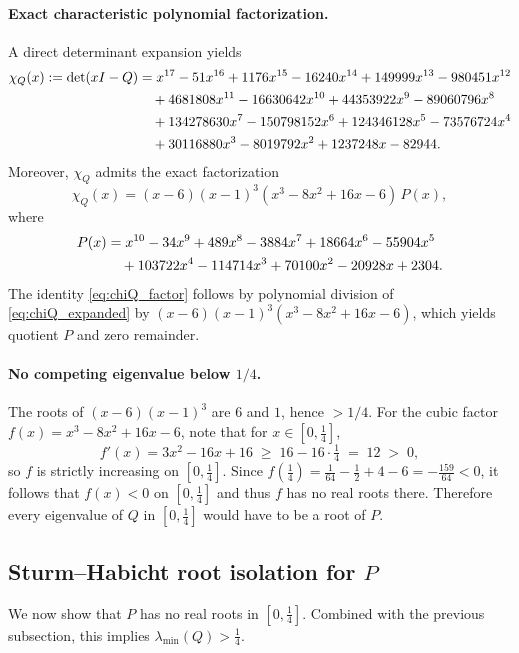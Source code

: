 \paragraph{Exact characteristic polynomial factorization.}
A direct determinant expansion yields
\begin{align}
\chi_Q(x):=\det(xI-Q)
&=x^{17}-51x^{16}+1176x^{15}-16240x^{14}+149999x^{13}-980451x^{12} \notag\\
&\quad +4681808x^{11}-16630642x^{10}+44353922x^{9}-89060796x^{8} \notag\\
&\quad +134278630x^{7}-150798152x^{6}+124346128x^{5}-73576724x^{4} \notag\\
&\quad +30116880x^{3}-8019792x^{2}+1237248x-82944.\label{eq:chiQ_expanded}
\end{align}
Moreover, $\chi_Q$ admits the exact factorization
\begin{equation}
\label{eq:chiQ_factor}
\chi_Q(x)
=(x-6)(x-1)^3(x^3-8x^2+16x-6)\,P(x),
\end{equation}
where
\begin{align}
P(x)
&=x^{10}-34x^9+489x^8-3884x^7+18664x^6-55904x^5 \notag\\
&\quad +103722x^4-114714x^3+70100x^2-20928x+2304.\label{eq:P_lambda_star}
\end{align}
The identity \eqref{eq:chiQ_factor} follows by polynomial division of \eqref{eq:chiQ_expanded} by $(x-6)(x-1)^3(x^3-8x^2+16x-6)$,
which yields quotient $P$ and zero remainder.

\paragraph{No competing eigenvalue below $1/4$.}
The roots of $(x-6)(x-1)^3$ are $6$ and $1$, hence $>1/4$.
For the cubic factor $f(x)=x^3-8x^2+16x-6$, note that for $x\in[0,\tfrac14]$,
\[
 f'(x)=3x^2-16x+16 \;\ge\; 16-16\cdot\tfrac14 \;=\;12 \;>\;0,
\]
so $f$ is strictly increasing on $[0,\tfrac14]$.
Since $f(\tfrac14)=\tfrac1{64}-\tfrac12+4-6=-\tfrac{159}{64}<0$, it follows that $f(x)<0$ on $[0,\tfrac14]$ and thus $f$ has no real roots there.
Therefore every eigenvalue of $Q$ in $[0,\tfrac14]$ would have to be a root of $P$.


\subsection{Sturm--Habicht root isolation for \texorpdfstring{$P$}{P}}
\label{app:lambda_star_certificate}

We now show that $P$ has no real roots in $[0,\tfrac14]$.
Combined with the previous subsection, this implies $\lambda_{\min}(Q)>\tfrac14$.

